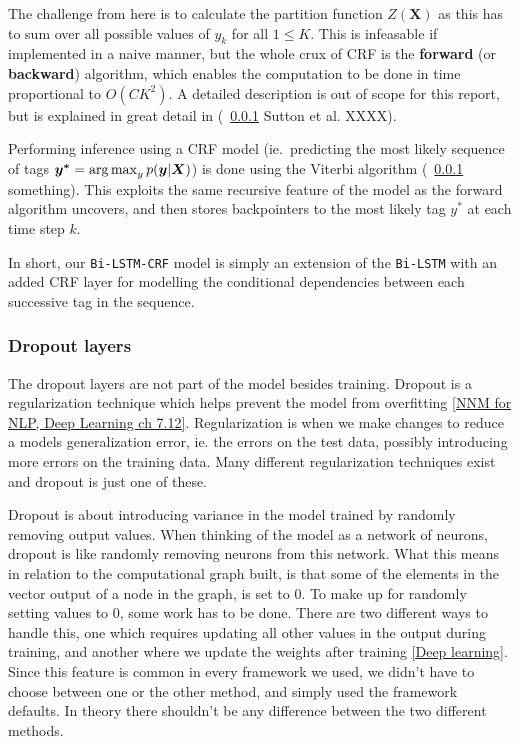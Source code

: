 The challenge from here is to calculate the partition function $Z(\bm{X})$ as
this has to sum over all possible values of $y_{k}$ for all $1 \leq K$. This is
infeasable if implemented in a naive manner, but the whole crux of CRF is the
\textbf{forward} (or \textbf{backward}) algorithm, which enables the computation
to be done in time proportional to $O(CK^{2})$. A detailed description is out of
scope for this report, but is explained in great detail in (~\ref{} Sutton et
al. XXXX).

Performing inference using a CRF model (ie.\ predicting the most likely sequence
of tags $\bm{y^{*}} = \operatorname*{arg\,max}_{y}p(\bm{y}|\bm{X})$) is done using the Viterbi
algorithm (~\ref{} something). This exploits the same recursive feature of the
model as the forward algorithm uncovers, and then stores backpointers to the
most likely tag $y^{*}$ at each time step $k$.

In short, our \texttt{Bi-LSTM-CRF} model is simply an extension of the
\texttt{Bi-LSTM} with an added CRF layer for modelling the conditional
dependencies between each successive tag in the sequence.

\subsubsection{Dropout layers}

The dropout layers are not part of the model besides training. Dropout is a
regularization technique which helps prevent the model from overfitting \ref{NNM
for NLP, Deep Learning ch 7.12}. Regularization is when we make changes to
reduce a models generalization error, ie. the errors on the test data, possibly
introducing more errors on the training data. Many different regularization
techniques exist and dropout is just one of these.

Dropout is about introducing variance in the model trained by randomly removing
output values. When thinking of the model as a network of neurons, dropout is
like randomly removing neurons from this network. What this means in relation to
the computational graph built, is that some of the elements in the vector output
of a node in the graph, is set to 0. To make up for randomly setting values to
0, some work has to be done. There are two different ways to handle this, one
which requires updating all other values in the output during training, and
another where we update the weights after training \ref{Deep learning}. Since
this feature is common in every framework we used, we didn't have to choose
between one or the other method, and simply used the framework defaults. In
theory there shouldn't be any difference between the two different methods.

